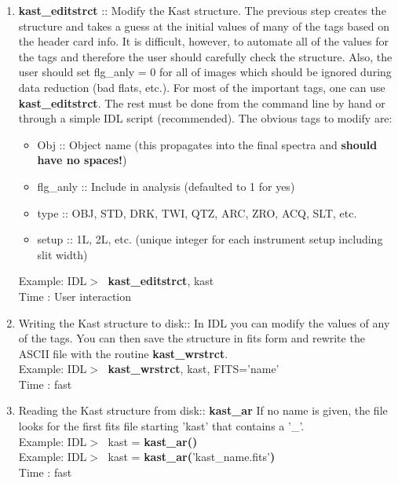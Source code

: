 \documentclass[11pt,letterpaper,dvips]{article}
\begin{document}
\begin{enumerate}
\begin{enumerate}
    \item {\bf kast\_editstrct} :: Modify the Kast structure.
	The previous step creates the structure and takes a guess at the 
	initial values of many of the tags based on the header card info.  It
	is difficult, however, to automate all of the values for the tags and
	therefore the user should carefully check the structure.  Also, the
	user should set flg\_anly = 0 for all of images which should
	be ignored during data reduction (bad flats, etc.).  For most of
	the important tags, one can use {\bf kast\_editstrct}.  The rest must
	be done from the command line by hand or through a simple
	IDL script (recommended). The obvious tags to modify are: 
	 \begin{itemize}
	  \item Obj :: Object name (this propagates into the final spectra 
		and {\bf should have no spaces!})
	  \item flg\_anly :: Include in analysis (defaulted to 1 for yes)
	  \item type :: OBJ, STD, DRK, TWI, QTZ, ARC, ZRO, ACQ, SLT, etc.  
	  \item setup :: 1L, 2L, etc.  (unique integer for each instrument
			setup including slit width)
	 \end{itemize}
         \quad Example: IDL$> \;$ {\bf kast\_editstrct}, kast \\  
         \quad Time   : User interaction

    \item Writing the Kast structure to disk:: In IDL you can modify the values
	of any of the tags.  You can then save the structure in fits form and 
	rewrite the ASCII file  with the routine {\bf kast\_wrstrct}. \\  
         \quad Example: IDL$> \;$ {\bf kast\_wrstrct}, kast, FITS='name' \\
         \quad Time   : fast

    \item Reading the Kast structure from disk:: {\bf kast\_ar}
	If no name is given, the file looks for the first fits 
	file starting 'kast' that contains a '\_'.  \\
         \quad Example: IDL$> \;$ kast = {\bf kast\_ar()} \\
         \quad Example: IDL$> \;$ kast = {\bf kast\_ar(}'kast\_name.fits'{\bf )} \\
         \quad Time   : fast

  \end{enumerate}


\end{enumerate}
\end{document}
